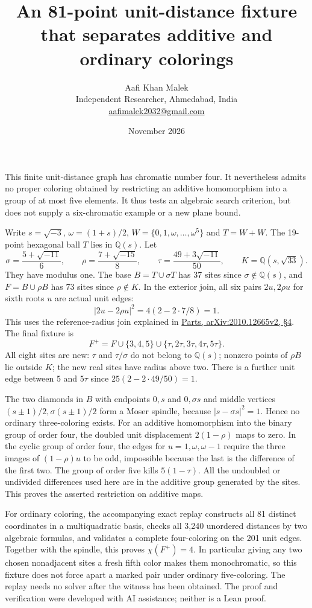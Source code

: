 \documentclass[11pt,letterpaper]{article}
\title{An 81-point unit-distance fixture that separates additive and ordinary colorings}
\author{Aafi Khan Malek\\\small Independent Researcher, Ahmedabad, India\\
\small\href{mailto:aafimalek2032@gmail.com}{aafimalek2032@gmail.com}}
\date{November 2026}
\begin{document}
\maketitle
This finite unit-distance graph has chromatic number four. It
nevertheless admits no proper coloring obtained by restricting
an additive homomorphism into a group of at most five elements.
It thus tests an algebraic search criterion, but does not
supply a six-chromatic example or a new plane bound.

Write \(s=\sqrt{-3}\), \(\omega=(1+s)/2\),
\(W=\{0,1,\omega,\ldots,\omega^5\}\) and \(T=W+W\).
The 19-point hexagonal ball \(T\) lies in \(\mathbb Q(s)\).
Let
\[
 \sigma=\frac{5+\sqrt{-11}}6,\qquad
 \rho=\frac{7+\sqrt{-15}}8,\qquad
 \tau=\frac{49+3\sqrt{-11}}{50},\qquad K=\mathbb Q(s,\sqrt{33}).
\]
They have modulus one. The base \(B=T\cup\sigma T\) has 37
sites since \(\sigma\notin\mathbb Q(s)\), and
\(F=B\cup\rho B\) has 73 sites since \(\rho\notin K\).
In the exterior join, all six pairs \(2u,2\rho u\) for sixth
roots \(u\) are actual unit edges:
\[
 |2u-2\rho u|^2=4(2-2\cdot7/8)=1.
\]
This uses the reference-radius join explained in
\href{https://arxiv.org/html/2010.12665v2#S4}{Parts, arXiv:2010.12665v2, \S4}.
The final fixture is
\[
 F^+=F\cup\{3,4,5\}\cup\{\tau,2\tau,3\tau,4\tau,5\tau\}.
\]
All eight sites are new: \(\tau\) and \(\tau/\sigma\) do not
belong to \(\mathbb Q(s)\); nonzero points of \(\rho B\)
lie outside \(K\); the new real sites have radius above two.
There is a further unit edge between \(5\) and \(5\tau\) since
\(25(2-2\cdot49/50)=1\).

The two diamonds in \(B\) with endpoints \(0,s\) and \(0,\sigma s\)
and middle vertices \((s\pm1)/2,\sigma(s\pm1)/2\) form a Moser
spindle, because \(|s-\sigma s|^2=1\). Hence no ordinary
three-coloring exists. For an additive homomorphism into the
binary group of order four, the doubled unit displacement
\(2(1-\rho)\) maps to zero. In the cyclic group of order four,
the edges for \(u=1,\omega,\omega-1\) require the three
images of \((1-\rho)u\) to be odd, impossible because the last
is the difference of the first two. The group of order five
kills \(5(1-\tau)\). All the undoubled or undivided differences
used here are in the additive group generated by the sites.
This proves the asserted restriction on additive maps.

For ordinary coloring, the accompanying exact replay
constructs all 81 distinct coordinates in a multiquadratic
basis, checks all 3,240 unordered distances by two algebraic
formulas, and validates a complete four-coloring on the
201 unit edges. Together with the spindle, this proves
\(\chi(F^+)=4\). In particular giving any two chosen
nonadjacent sites a fresh fifth color makes them monochromatic,
so this fixture does not force apart a marked pair under
ordinary five-coloring. The replay needs no solver after
the witness has been obtained. The proof and verification
were developed with AI assistance; neither is a Lean proof.
\end{document}
